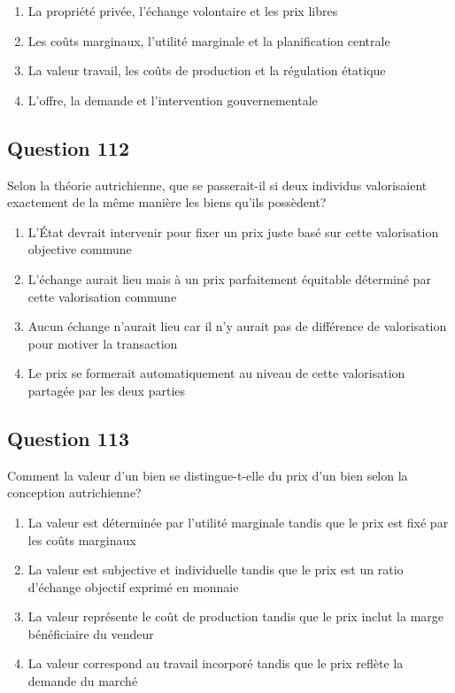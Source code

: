 \documentclass[12pt,a4paper]{article}
\begin{document}
\begin{enumerate}[label=\Alph*., leftmargin=*]
\item La propriété privée, l'échange volontaire et les prix libres
\item Les coûts marginaux, l'utilité marginale et la planification centrale
\item La valeur travail, les coûts de production et la régulation étatique
\item L'offre, la demande et l'intervention gouvernementale
\end{enumerate}

\bigskip


\subsection*{Question 112}
Selon la théorie autrichienne, que se passerait-il si deux individus valorisaient exactement de la même manière les biens qu'ils possèdent?

\begin{enumerate}[label=\Alph*., leftmargin=*]
\item L'État devrait intervenir pour fixer un prix juste basé sur cette valorisation objective commune
\item L'échange aurait lieu mais à un prix parfaitement équitable déterminé par cette valorisation commune
\item Aucun échange n'aurait lieu car il n'y aurait pas de différence de valorisation pour motiver la transaction
\item Le prix se formerait automatiquement au niveau de cette valorisation partagée par les deux parties
\end{enumerate}

\bigskip


\subsection*{Question 113}
Comment la valeur d'un bien se distingue-t-elle du prix d'un bien selon la conception autrichienne?

\begin{enumerate}[label=\Alph*., leftmargin=*]
\item La valeur est déterminée par l'utilité marginale tandis que le prix est fixé par les coûts marginaux
\item La valeur est subjective et individuelle tandis que le prix est un ratio d'échange objectif exprimé en monnaie
\item La valeur représente le coût de production tandis que le prix inclut la marge bénéficiaire du vendeur
\item La valeur correspond au travail incorporé tandis que le prix reflète la demande du marché
\end{enumerate}
\end{document}
